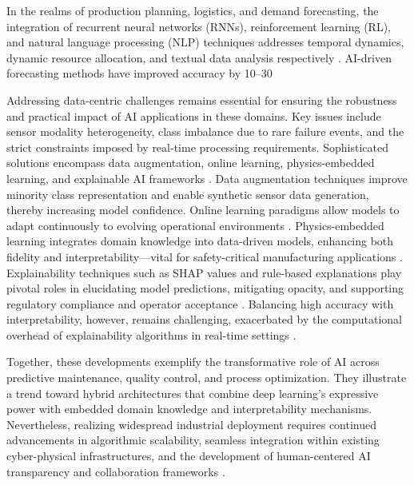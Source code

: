 \documentclass[11pt]{article}
\begin{document}
In the realms of production planning, logistics, and demand forecasting, the integration of recurrent neural networks (RNNs), reinforcement learning (RL), and natural language processing (NLP) techniques addresses temporal dynamics, dynamic resource allocation, and textual data analysis respectively \cite{ref40}. AI-driven forecasting methods have improved accuracy by 10–30%

Addressing data-centric challenges remains essential for ensuring the robustness and practical impact of AI applications in these domains. Key issues include sensor modality heterogeneity, class imbalance due to rare failure events, and the strict constraints imposed by real-time processing requirements. Sophisticated solutions encompass data augmentation, online learning, physics-embedded learning, and explainable AI frameworks \cite{ref29,ref34,ref37,ref38}. Data augmentation techniques improve minority class representation and enable synthetic sensor data generation, thereby increasing model confidence. Online learning paradigms allow models to adapt continuously to evolving operational environments \cite{ref29}. Physics-embedded learning integrates domain knowledge into data-driven models, enhancing both fidelity and interpretability—vital for safety-critical manufacturing applications \cite{ref34}. Explainability techniques such as SHAP values and rule-based explanations play pivotal roles in elucidating model predictions, mitigating opacity, and supporting regulatory compliance and operator acceptance \cite{ref38}. Balancing high accuracy with interpretability, however, remains challenging, exacerbated by the computational overhead of explainability algorithms in real-time settings \cite{ref37}.

Together, these developments exemplify the transformative role of AI across predictive maintenance, quality control, and process optimization. They illustrate a trend toward hybrid architectures that combine deep learning’s expressive power with embedded domain knowledge and interpretability mechanisms. Nevertheless, realizing widespread industrial deployment requires continued advancements in algorithmic scalability, seamless integration within existing cyber-physical infrastructures, and the development of human-centered AI transparency and collaboration frameworks \cite{ref9,ref24,ref36}.
\end{document}
